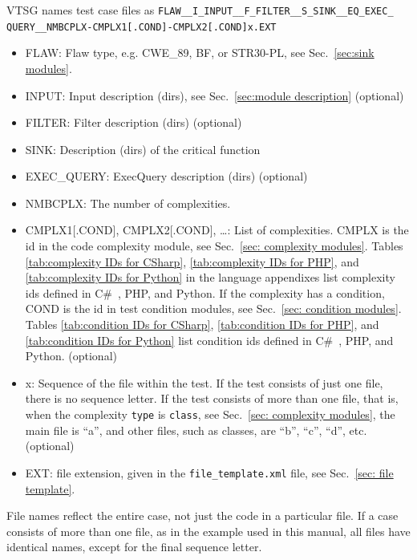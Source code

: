 \documentclass[12pt]{article}
\newcommand{\CSharp}{C{\fontseries{b}\selectfont\#}}
\begin{document}
VTSG names test case files as
\verb|FLAW__I_INPUT__F_FILTER__S_SINK__EQ_EXEC_| \\
\verb|QUERY__NMBCPLX-CMPLX1[.COND]-CMPLX2[.COND]x.EXT|
\begin{itemize}[nosep]
    \item FLAW: Flaw type, e.g. CWE\_89, BF, or STR30-PL, see
	Sec.~\ref{sec:sink modules}.
    \item INPUT: Input description (dirs), see Sec.~\ref{sec:module description} (optional)
    \item FILTER:  Filter description (dirs) (optional)
    \item SINK:  Description (dirs) of the critical function
    \item EXEC\_QUERY:  ExecQuery description (dirs) (optional)

    \item NMBCPLX:  The number of complexities.
    \item CMPLX1[.COND], CMPLX2[.COND], \ldots: List of complexities.
            CMPLX is the id in the code complexity module,
            see Sec.~\ref{sec: complexity modules}.
            Tables \ref{tab:complexity IDs for CSharp},
            \ref{tab:complexity IDs for PHP}, and
            \ref{tab:complexity IDs for Python} in the language appendixes list
            complexity ids defined in \CSharp\ , PHP, and Python.
            If the complexity has a
            condition, COND is the id in test condition modules,
            see Sec.~\ref{sec: condition modules}.
            Tables \ref{tab:condition IDs for CSharp},
            \ref{tab:condition IDs for PHP}, and
            \ref{tab:condition IDs for Python} list condition
            ids defined in \CSharp\ , PHP, and Python. (optional)
    \item x: Sequence of the file within the test.  If the test consists of just one
      file, there is no sequence letter.  If the test consists of more than one file,
      that is, when the complexity \verb|type| is \verb|class|,
      see Sec.~\ref{sec: complexity modules},
      the main file is ``a'', and other files, such as classes, are ``b'', ``c'',
      ``d'', etc. (optional)
    \item EXT: file extension, given in the \verb|file_template.xml| file, see
    Sec.~\ref{sec: file template}.
\end{itemize}

File names reflect the entire case, not just the code in a
particular file.  If a case consists of more than one file, as in the
example used in this manual, all files have
identical names, except for the final sequence letter.
\end{document}
